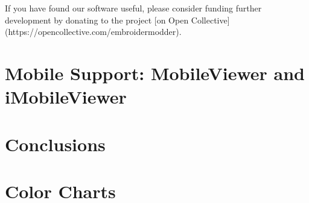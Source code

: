 \documentclass[a4paper, 11pt]{report}
\begin{document}
If you have found our software useful, please consider funding further development by donating to the project [on Open Collective](https://opencollective.com/embroidermodder).

\chapter{Mobile Support: MobileViewer and iMobileViewer}


\chapter{Conclusions}




\appendix



\chapter{Color Charts}
\end{document}
